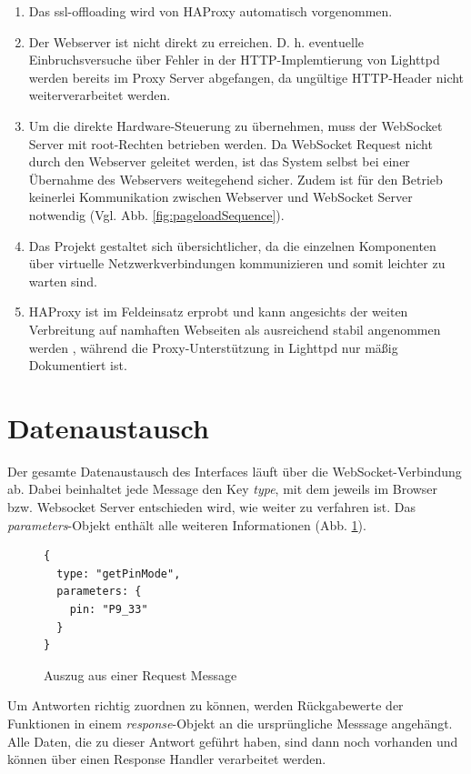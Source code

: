 \begin{enumerate}
  \item Das \gls{ssl-offloading} wird von HAProxy automatisch vorgenommen.
  \item Der Webserver ist nicht direkt zu erreichen. D. h. eventuelle Einbruchsversuche über Fehler in der HTTP-Implemtierung von Lighttpd werden bereits im Proxy Server abgefangen, da ungültige HTTP-Header nicht weiterverarbeitet werden.
  \item Um die direkte Hardware-Steuerung zu übernehmen, muss der WebSocket Server mit root-Rechten betrieben werden. Da WebSocket Request nicht durch den Webserver geleitet werden, ist das System selbst bei einer Übernahme des Webservers weitegehend sicher. Zudem ist für den Betrieb keinerlei Kommunikation zwischen Webserver und WebSocket Server notwendig (Vgl. Abb. \ref{fig:pageloadSequence}).
  \item Das Projekt gestaltet sich übersichtlicher, da die einzelnen Komponenten über virtuelle Netzwerkverbindungen kommunizieren und somit leichter zu warten sind.   
  \item HAProxy ist im Feldeinsatz erprobt und kann angesichts der weiten Verbreitung auf namhaften Webseiten als ausreichend stabil angenommen werden \cite{kuehnast2014}, während die Proxy-Unterstützung in Lighttpd nur mäßig Dokumentiert ist.
\end{enumerate}


\section{Datenaustausch}
Der gesamte Datenaustausch des Interfaces läuft über die WebSocket-Verbindung ab. Dabei beinhaltet jede Message den Key \textit{type}, mit dem jeweils im Browser bzw. Websocket Server entschieden wird, wie weiter zu verfahren ist. Das \textit{parameters}-Objekt enthält alle weiteren Informationen (Abb. \ref{lst:requestMessage}).\\

\begin{figure}[ht]
\begin{lstlisting}
{
  type: "getPinMode",
  parameters: {
    pin: "P9_33"
  }
}
\end{lstlisting}
\caption{Auszug aus einer Request Message}
\label{lst:requestMessage}
\end{figure}

Um Antworten richtig zuordnen zu können, werden Rückgabewerte der Funktionen in einem \textit{response}-Objekt an die ursprüngliche Messsage angehängt. Alle Daten, die zu dieser Antwort geführt haben, sind dann noch vorhanden und können über einen Response Handler verarbeitet werden.\\

